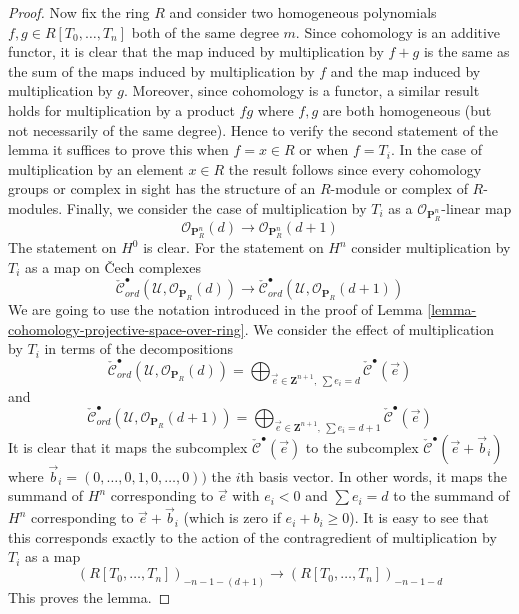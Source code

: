 \documentclass[10pt,a4paper]{amsart}
\theoremstyle{plain}
\theoremstyle{definition}
\theoremstyle{remark}
\numberwithin{equation}{subsection}
\begin{document}
\begin{proof}
\medskip\noindent
Now fix the ring $R$ and consider two homogeneous polynomials
$f, g \in R[T_0, \ldots, T_n]$ both of the same degree $m$.
Since cohomology is an additive functor, it is clear that the
map induced by multiplication by $f + g$ is the same as the sum
of the maps induced by multiplication by $f$ and the map induced
by multiplication by $g$. Moreover, since cohomology is a functor,
a similar result holds for multiplication by a product $fg$ where
$f, g$ are both homogeneous (but not necessarily of the same degree).
Hence to verify the second statement of the lemma it suffices to
prove this when $f = x \in R$ or when $f = T_i$.
In the case of multiplication by an element $x \in R$ the result
follows since every cohomology groups or complex in sight has the
structure of an $R$-module or complex of $R$-modules.
Finally, we consider the case of multiplication by $T_i$
as a $\mathcal{O}_{\mathbf{P}^n_R}$-linear map
$$
\mathcal{O}_{\mathbf{P}^n_R}(d)
\longrightarrow
\mathcal{O}_{\mathbf{P}^n_R}(d + 1)
$$
The statement on $H^0$ is clear. For the statement on $H^n$
consider multiplication by $T_i$ as a map on {\v C}ech complexes
$$
\check{\mathcal{C}}_{ord}^\bullet(\mathcal{U},
\mathcal{O}_{\mathbf{P}_R}(d))
\longrightarrow
\check{\mathcal{C}}_{ord}^\bullet(\mathcal{U},
\mathcal{O}_{\mathbf{P}_R}(d + 1))
$$
We are going to use the notation introduced in the proof of
Lemma \ref{lemma-cohomology-projective-space-over-ring}.
We consider the effect of multiplication by $T_i$
in terms of the decompositions
$$
\check{\mathcal{C}}_{ord}^\bullet(\mathcal{U}, \mathcal{O}_{\mathbf{P}_R}(d))
=
\bigoplus\nolimits_{\vec{e} \in \mathbf{Z}^{n + 1}, \ \sum e_i = d}
\check{\mathcal{C}}^\bullet(\vec{e})
$$
and
$$
\check{\mathcal{C}}_{ord}^\bullet(\mathcal{U},
\mathcal{O}_{\mathbf{P}_R}(d + 1))
=
\bigoplus\nolimits_{\vec{e} \in \mathbf{Z}^{n + 1}, \ \sum e_i = d + 1}
\check{\mathcal{C}}^\bullet(\vec{e})
$$
It is clear that it maps the subcomplex
$\check{\mathcal{C}}^\bullet(\vec{e})$ to the subcomplex
$\check{\mathcal{C}}^\bullet(\vec{e} + \vec{b}_i)$ where
$\vec{b}_i = (0, \ldots, 0, 1, 0, \ldots, 0))$ the $i$th basis vector.
In other words, it maps the summand of $H^n$ corresponding to
$\vec{e}$ with $e_i < 0$ and $\sum e_i = d$
to the summand of $H^n$ corresponding to
$\vec{e} + \vec{b}_i$ (which is zero if $e_i + b_i \geq 0$).
It is easy to see that this corresponds exactly to the action
of the contragredient of multiplication by $T_i$ as a map
$$
(R[T_0, \ldots, T_n])_{-n - 1 - (d + 1)}
\longrightarrow
(R[T_0, \ldots, T_n])_{-n - 1 - d}
$$
This proves the lemma.
\end{proof}
\end{document}
